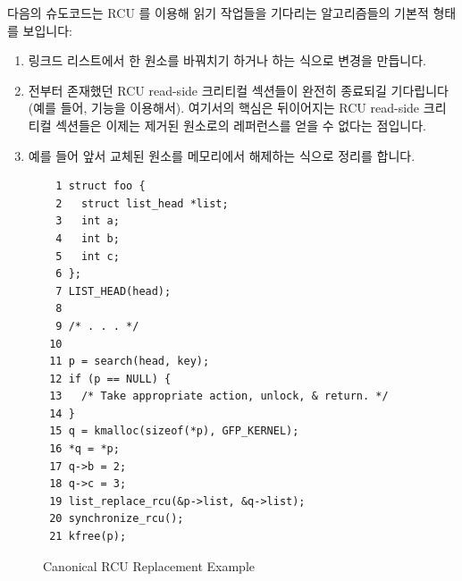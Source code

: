 다음의 슈도코드는 RCU 를 이용해 읽기 작업들을 기다리는 알고리즘들의 기본적
형태를 보입니다:

\begin{enumerate}
\item	링크드 리스트에서 한 원소를 바꿔치기 하거나 하는 식으로 변경을
	만듭니다.
\item	전부터 존재했던 RCU read-side 크리티컬 섹션들이 완전히 종료되길
	기다립니다 (예를 들어,  기능을 이용해서).
	여기서의 핵심은 뒤이어지는 RCU read-side 크리티컬 섹션들은 이제는
	제거된 원소로의 레퍼런스를 얻을 수 없다는 점입니다.
\item	예를 들어 앞서 교체된 원소를 메모리에서 해제하는 식으로 정리를 합니다.

\end{enumerate}

\begin{figure}[tbp]
{ \scriptsize
\begin{verbatim}
  1 struct foo {
  2   struct list_head *list;
  3   int a;
  4   int b;
  5   int c;
  6 };
  7 LIST_HEAD(head);
  8
  9 /* . . . */
 10
 11 p = search(head, key);
 12 if (p == NULL) {
 13   /* Take appropriate action, unlock, & return. */
 14 }
 15 q = kmalloc(sizeof(*p), GFP_KERNEL);
 16 *q = *p;
 17 q->b = 2;
 18 q->c = 3;
 19 list_replace_rcu(&p->list, &q->list);
 20 synchronize_rcu();
 21 kfree(p);
\end{verbatim}
}
\caption{Canonical RCU Replacement Example}
\label{fig:defer:Canonical RCU Replacement Example}
\end{figure}

